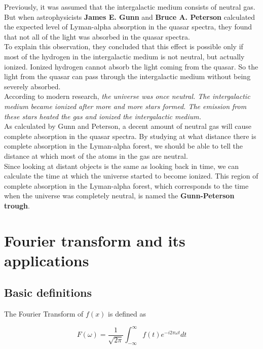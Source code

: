 \documentclass[a4,12pt,oneside]{report}
\begin{document}
	Previously, it was assumed that the intergalactic medium consists of neutral gas. But when astrophysicists {\bf James E. Gunn} and {\bf Bruce A. Peterson} calculated the expected level of 
        Lyman-alpha absorption in the quasar spectra, they found that not all of the light was absorbed in the quasar spectra. 
        \\
        To explain this observation, they concluded that this effect is possible only if most of the hydrogen in the intergalactic medium is not neutral, but actually 
        ionized. Ionized hydrogen cannot absorb the light coming from the quasar.
        So the light from the quasar can pass through the intergalactic medium without being severely absorbed.
        \\
        According to modern research, \textit{the universe was once neutral. The intergalactic medium became ionized after more and more stars
        formed. The emission from these stars heated the gas and ionized the intergalactic medium.}
        \\
        As calculated by Gunn and Peterson, a decent amount of neutral gas will cause complete absorption in the quasar spectra.
        By studying at what distance there is complete absorption in the Lyman-alpha forest, we should be able to tell the distance at
        which most of the atoms in the gas are neutral.
        \\
        Since looking at distant objects is the same as looking back in time, we can calculate the time at which the universe started to become ionized.
        This region of complete absorption in the Lyman-alpha forest, which corresponds to the time when the universe was completely neutral, is named the 
        {\bf Gunn-Peterson trough}.
        
     
        \chapter{Fourier transform and its applications}
        
        \section{Basic definitions}
        
        The Fourier Transform of $f(x)$ is defined as
        
        \begin{equation}
         F(\omega) = \frac{1}{\sqrt{2\pi}}\int_{-\infty}^{\infty} f(t)e^{-i2\pi \omega t} dt
        \end{equation}
        
\end{document}
